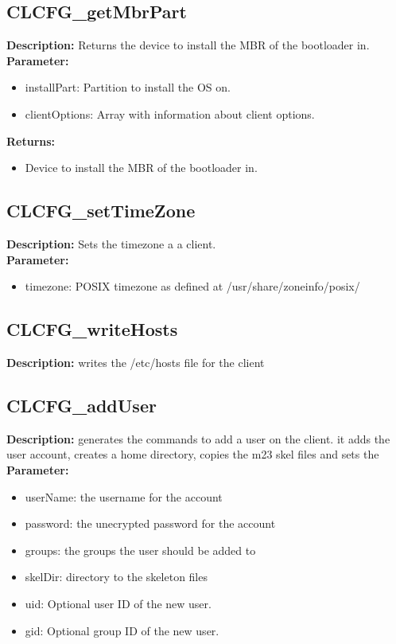 \subsection{CLCFG\_getMbrPart}
\textbf{Description:} Returns the device to install the MBR of the bootloader in.\\
\textbf{Parameter:}
\begin{itemize}
\item installPart: Partition to install the OS on.
\item clientOptions: Array with information about client options.
\end{itemize}
\textbf{Returns:}
\begin{itemize}
\item Device to install the MBR of the bootloader in.
\end{itemize}

\subsection{CLCFG\_setTimeZone}
\textbf{Description:} Sets the timezone a a client.\\
\textbf{Parameter:}
\begin{itemize}
\item timezone: POSIX timezone as defined at /usr/share/zoneinfo/posix/
\end{itemize}

\subsection{CLCFG\_writeHosts}
\textbf{Description:} writes the /etc/hosts file for the client\\

\subsection{CLCFG\_addUser}
\textbf{Description:} generates the commands to add a user on the client. it adds the user account, creates a home directory, copies the m23 skel files and sets the\\
\textbf{Parameter:}
\begin{itemize}
\item userName: the username for the account
\item password: the unecrypted password for the account
\item groups: the groups the user should be added to
\item skelDir: directory to the skeleton files
\item uid: Optional user ID of the new user.
\item gid: Optional group ID of the new user.
\end{itemize}

